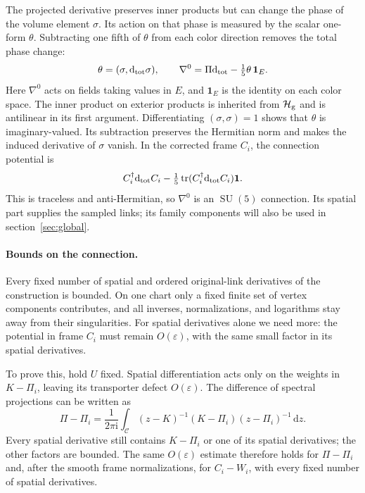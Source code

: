 \documentclass[11pt,a4paper]{article}
\theoremstyle{remark}
\DeclareMathOperator{\tr}{tr}
\DeclareMathOperator{\SU}{SU}
\newcommand{\Id}{\mathbf 1}
\newcommand{\dd}{\mathrm d}
\newcommand{\ii}{\mathrm i}
\newcommand{\eps}{\varepsilon}
\begin{document}
The projected derivative preserves inner products but can change the
phase of the volume element $\sigma$. Its action on that phase is
measured by the scalar one-form $\theta$. Subtracting one fifth of
$\theta$ from each color direction removes the total phase change:
\begin{equation}
 \theta=(\sigma,\dd_{\rm tot}\sigma),\qquad
 \nabla^0=\Pi\dd_{\rm tot}-\tfrac15\theta\,\Id_E .
 \label{app:g:connection}
\end{equation}
Here $\nabla^0$ acts on fields taking values in $E$, and $\Id_E$
is the identity on each color space. The inner product on exterior
products is inherited from $\mathcal H_{\rm g}$ and is antilinear
in its first argument. Differentiating $(\sigma,\sigma)=1$ shows
that $\theta$ is imaginary-valued. Its subtraction preserves the
Hermitian norm and makes the induced derivative of $\sigma$ vanish.
In the corrected frame $C_i$, the connection potential is
\begin{equation}
 C_i^{\dagger}\dd_{\rm tot} C_i
       -\tfrac15\tr(C_i^{\dagger}\dd_{\rm tot} C_i)\Id .
\end{equation}
This is traceless and anti-Hermitian, so $\nabla^0$ is an $\SU(5)$
connection. Its spatial part supplies the sampled links; its family
components will also be used in section~\ref{sec:global}.

\paragraph{Bounds on the connection.}
Every fixed number of spatial and ordered original-link derivatives of
the construction is bounded. On one chart only a fixed finite set of
vertex components contributes, and all inverses, normalizations, and
logarithms stay away from their singularities. For spatial derivatives
alone we need more: the potential in frame $C_i$ must remain $O(\eps)$,
with the same small factor in its spatial derivatives.

To prove this, hold $U$ fixed. Spatial differentiation acts only on the
weights in $K-\Pi_i$, leaving its transporter defect $O(\eps)$.
The difference of spectral projections can be written as
\begin{equation}
 \Pi-\Pi_i=\frac1{2\pi\ii}\int_{\mathcal C}
 (z-K)^{-1}(K-\Pi_i)(z-\Pi_i)^{-1}\,\dd z .
 \label{app:g:projection-difference}
\end{equation}
Every spatial derivative still contains $K-\Pi_i$ or one of its
spatial derivatives; the other factors are bounded. The same
$O(\eps)$ estimate therefore holds for $\Pi-\Pi_i$ and, after
the smooth frame normalizations, for $C_i-W_i$, with every fixed
number of spatial derivatives.
\end{document}
